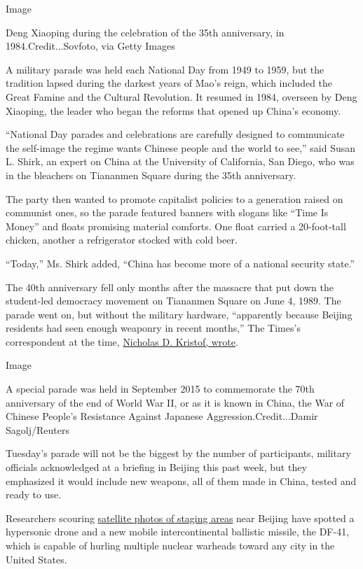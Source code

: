 Image

Deng Xiaoping during the celebration of the 35th anniversary, in
1984.Credit...Sovfoto, via Getty Images

A military parade was held each National Day from 1949 to 1959, but the
tradition lapsed during the darkest years of Mao's reign, which included
the Great Famine and the Cultural Revolution. It resumed in 1984,
overseen by Deng Xiaoping, the leader who began the reforms that opened
up China's economy.

``National Day parades and celebrations are carefully designed to
communicate the self-image the regime wants Chinese people and the world
to see,'' said Susan L. Shirk, an expert on China at the University of
California, San Diego, who was in the bleachers on Tiananmen Square
during the 35th anniversary.

The party then wanted to promote capitalist policies to a generation
raised on communist ones, so the parade featured banners with slogans
like ``Time Is Money'' and floats promising material comforts. One float
carried a 20-foot-tall chicken, another a refrigerator stocked with cold
beer.

``Today,'' Ms. Shirk added, ``China has become more of a national
security state.''

The 40th anniversary fell only months after the massacre that put down
the student-led democracy movement on Tiananmen Square on June 4, 1989.
The parade went on, but without the military hardware, ``apparently
because Beijing residents had seen enough weaponry in recent months,''
The Times's correspondent at the time,
\href{https://www.nytimes.com/1989/10/02/world/people-s-china-celebrates-but-without-the-people.html}{Nicholas
D. Kristof, wrote}.

Image

A special parade was held in September 2015 to commemorate the 70th
anniversary of the end of World War II, or as it is known in China, the
War of Chinese People's Resistance Against Japanese
Aggression.Credit...Damir Sagolj/Reuters

Tuesday's parade will not be the biggest by the number of participants,
military officials acknowledged at a briefing in Beijing this past week,
but they emphasized it would include new weapons, all of them made in
China, tested and ready to use.

Researchers scouring
\href{https://www.frstrategie.org/sites/default/files/documents/publications/images-strategiques/2019/strategic-imagery-military-parade-70th-anniversary-PRC-2019.pdf}{satellite
photos of staging areas} near Beijing have spotted a hypersonic drone
and a new mobile intercontinental ballistic missile, the DF-41, which is
capable of hurling multiple nuclear warheads toward any city in the
United States.

